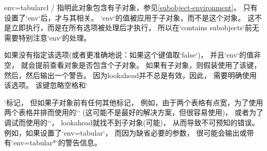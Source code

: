 \begin{tableobject}{env=tabular}{cl}
 /
  指明此对象包含有子对象，参见\cref{subobject-environment}。
  只有设置了`env`后，才与其相关。
  `env`的值被应用于子对象，而不是这个对象。
  这不是立即执行，而是在所有选项被处理后才执行，
  所以在`contains subobjects`前无需要特别注意`env`的处理。

  如果没有指定该选项(或者更准确地说：如果这个键值取`false`)，
  并且`env`的值非空，
  就会提前查看对象是否包含个子对象。
  如果有子对象，则假装使用了该键，
  然后，然后输出一个警告。
  因为lookahead并不总是有效，因此，
  需要明确使用该选项。
  该键忽略空格和`\par`标记，
  但如果子对象前有任何其他标记，
  例如，由于两个表格有点宽，为了使用两个表格并排而使用的`\small`
  (这可能不是最好的解决方案，但很容易使用)，
  或者为了调试而使用的`\typeout`，
  lookahead就找不到子对象(可能)，
  从而导致不可预知的错误。
  例如，如果设置了`env=tabular`，
  而因为缺省必要的参数，
  很可能会输出或带有`env=tabular*`的警告信息。
\endkeydoc



\end{tableobject}
